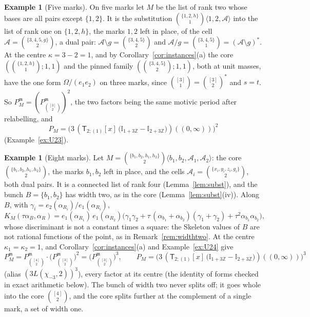 \documentclass[11pt]{article}
\theoremstyle{plain}
\theoremstyle{definition}
\newtheorem{example}[prop]{Example}
\theoremstyle{remark}
\newcommand{\Z}{\mathbb Z}
\newcommand{\m}{\mathfrak m}
\newcommand{\sT}{\mathsf T}
\newcommand{\Ilat}[1]{\mathbb I_{#1}}
\newcommand{\Tx}[3]{(\sT_{#1;(1)}[x]\,#2)((#3,\infty))}
\begin{document}
\begin{example}[Five marks]\label{ex:five}
On five marks let $M$ be the list of rank two whose bases are all pairs except $\{1,2\}$. It is the substitution $\binom{\{1,2,h\}}1\langle1,2,\mathcal A\rangle$ into the list of rank one on $\{1,2,h\}$, the marks $1,2$ left in place, of the cell $\mathcal A=\binom{\{3,4,5,g\}}2$, a dual pair: $\mathcal A\setminus g=\binom{\{3,4,5\}}2$ and $\mathcal A/g=\binom{\{3,4,5\}}1=(\mathcal A\setminus g)^\ast$. At the centre $\kappa=3-2=1$, and by Corollary~\ref{cor:instances}(a) the core $(\binom{\{1,2,h\}}1;1,1)$ and the pinned family $(\binom{\{3,4,5\}}2;1,1)$, both at unit masses, have the one form $\Omega/(e_1e_2)$ on three marks, since $\binom{[3]}1=\binom{[3]}2^\ast$ and $s=t$. So $P^{\m}_M=(P^{\m}_{\binom{[3]}2})^2$, the two factors being the same motivic period after relabelling, and
\[
P_M=\Big(3\,\Tx{2}{\big(\Ilat{1+3\Z}-\Ilat{2+3\Z}\big)}{0}\Big)^2
\]
(Example~\ref{ex:U23}).
\end{example}

\begin{example}[Eight marks]\label{ex:M8}
Let $M=\binom{\{b_1,b_2,h_1,h_2\}}2\langle b_1,b_2,\mathcal A_1,\mathcal A_2\rangle$: the core $\binom{\{b_1,b_2,h_1,h_2\}}2$, the marks $b_1,b_2$ left in place, and the cells $\mathcal A_i=\binom{\{x_i,y_i,z_i,g_i\}}2$, both dual pairs. It is a connected list of rank four (Lemma~\ref{lem:subst}), and the bunch $B=\{b_1,b_2\}$ has width two, as in the core (Lemma~\ref{lem:subst}(iv)). Along $B$, with $\gamma_i=e_2(\alpha_{R_i})/e_1(\alpha_{R_i})$,
\[
K_M(\tau\alpha_B,\alpha_R)=e_1(\alpha_{R_1})\,e_1(\alpha_{R_2})\Big(\gamma_1\gamma_2+\tau\,(\alpha_{b_1}+\alpha_{b_2})(\gamma_1+\gamma_2)+\tau^2\alpha_{b_1}\alpha_{b_2}\Big),
\]
whose discriminant is not a constant times a square: the Skeleton values of $B$ are not rational functions of the point, as in Remark~\ref{rem:widthtwo}. At the centre $\kappa_1=\kappa_2=1$, and Corollary~\ref{cor:instances}(a) and Example~\ref{ex:U24} give
\[
P^{\m}_M=P^{\m}_{\binom{[4]}2}\cdot\big(P^{\m}_{\binom{[3]}2}\big)^2=\big(P^{\m}_{\binom{[3]}2}\big)^3,\qquad P_M=\Big(3\,\Tx{2}{\big(\Ilat{1+3\Z}-\Ilat{2+3\Z}\big)}{0}\Big)^3
\]
(alias $(3L(\chi_{-3},2))^3$), every factor at its centre (the identity of forms checked in exact arithmetic below). The bunch of width two never splits off; it goes whole into the core $\binom{[4]}2$, and the core splits further at the complement of a single mark, a set of width one.
\end{example}
\end{document}
